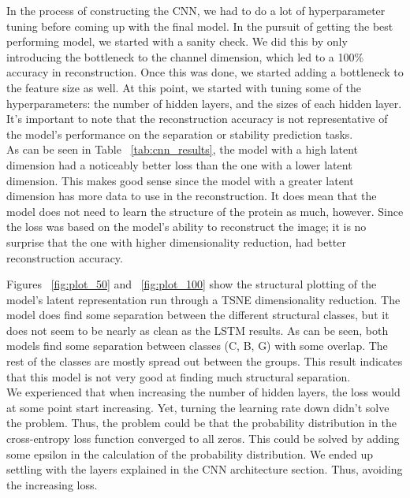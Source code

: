 In the process of constructing the CNN, we had to do a lot of hyperparameter tuning before coming up with the final model. In the pursuit of getting the best performing model, we started with a sanity check. We did this by only introducing the bottleneck to the channel dimension, which led to a 100\% accuracy in reconstruction. Once this was done, we started adding a bottleneck to the feature size as well. At this point, we started with tuning some of the hyperparameters: the number of hidden layers, and the sizes of each hidden layer. \\

\noindent
It's important to note that the reconstruction accuracy is not representative of the model's performance on the separation or stability prediction tasks.\\

\noindent
As can be seen in Table ~\ref{tab:cnn_results}, the model with a high latent dimension had a noticeably better loss than the one with a lower latent dimension. This makes good sense since the model with a greater latent dimension has more data to use in the reconstruction. It does mean that the model does not need to learn the structure of the protein as much, however. Since the loss was based on the model's ability to reconstruct the image; it is no surprise that the one with higher dimensionality reduction, had better reconstruction accuracy.

\noindent
Figures ~\ref{fig:plot_50} and ~\ref{fig:plot_100} show the structural plotting of the model's latent representation run through a TSNE dimensionality reduction. The model does find some separation between the different structural classes, but it does not seem to be nearly as clean as the LSTM results. As can be seen, both models find some separation between classes (C, B, G) with some overlap. The rest of the classes are mostly spread out between the groups. This result indicates that this model is not very good at finding much structural separation. \\

\noindent
We experienced that when increasing the number of hidden layers, the loss would at some point start increasing. Yet, turning the learning rate down didn't solve the problem. Thus, the problem could be that the probability distribution in the cross-entropy loss function converged to all zeros. This could be solved by adding some epsilon in the calculation of the probability distribution. We ended up settling with the layers explained in the CNN architecture section. Thus, avoiding the increasing loss. \\

